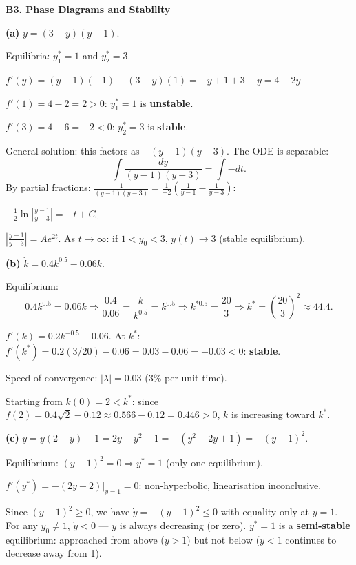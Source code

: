 \documentclass[12pt, a4paper]{article}
\theoremstyle{definition}
\newcommand{\eval}[2]{\left.#1\right|_{#2}}
\begin{document}
\begin{solbox}
\textbf{B3. Phase Diagrams and Stability}

\textbf{(a)} $\dot y=(3-y)(y-1)$.

Equilibria: $y_1^*=1$ and $y_2^*=3$.

$f'(y)=(y-1)(-1)+(3-y)(1)=-y+1+3-y=4-2y$

$f'(1)=4-2=2>0$: $y_1^*=1$ is \textbf{unstable}.

$f'(3)=4-6=-2<0$: $y_2^*=3$ is \textbf{stable}.

General solution: this factors as $-(y-1)(y-3)$. The ODE is separable:
\[
  \int\frac{dy}{(y-1)(y-3)}=\int -dt.
\]
By partial fractions: $\displaystyle\frac{1}{(y-1)(y-3)} = \frac{1}{-2}\!\left(\frac{1}{y-1}-\frac{1}{y-3}\right)$:

$-\frac{1}{2}\ln\left|\frac{y-1}{y-3}\right|=-t+C_0$

$\left|\frac{y-1}{y-3}\right|=Ae^{2t}$. As $t\to\infty$: if $1<y_0<3$,
$y(t)\to 3$ (stable equilibrium). \checkmark

\textbf{(b)} $\dot k=0.4k^{0.5}-0.06k$.

Equilibrium:
\[
  0.4k^{0.5}=0.06k
  \Rightarrow \frac{0.4}{0.06}=\frac{k}{k^{0.5}}=k^{0.5}
  \Rightarrow k^{*0.5}=\frac{20}{3}
  \Rightarrow k^*=\left(\frac{20}{3}\right)^2\approx 44.4.
\]

$f'(k)=0.2k^{-0.5}-0.06$. At $k^*$: $f'(k^*)=0.2(3/20)-0.06=0.03-0.06=-0.03<0$: \textbf{stable}.

Speed of convergence: $|\lambda|=0.03$ (3\% per unit time).

Starting from $k(0)=2<k^*$: since $f(2)=0.4\sqrt{2}-0.12\approx 0.566-0.12=0.446>0$, $k$ is increasing toward $k^*$.

\textbf{(c)} $\dot y=y(2-y)-1=2y-y^2-1=-(y^2-2y+1)=-(y-1)^2$.

Equilibrium: $(y-1)^2=0 \Rightarrow y^*=1$ (only one equilibrium).

$f'(y^*)=\eval{-(2y-2)}{y=1}=0$: non-hyperbolic, linearisation inconclusive.

Since $(y-1)^2\geq 0$, we have $\dot y=-(y-1)^2\leq 0$ with equality only at $y=1$. For any $y_0\neq 1$, $\dot y<0$ --- $y$ is always decreasing (or zero). $y^*=1$ is a \textbf{semi-stable} equilibrium: approached from above ($y>1$) but not below ($y<1$ continues to decrease away from 1).
\end{solbox}
\end{document}
